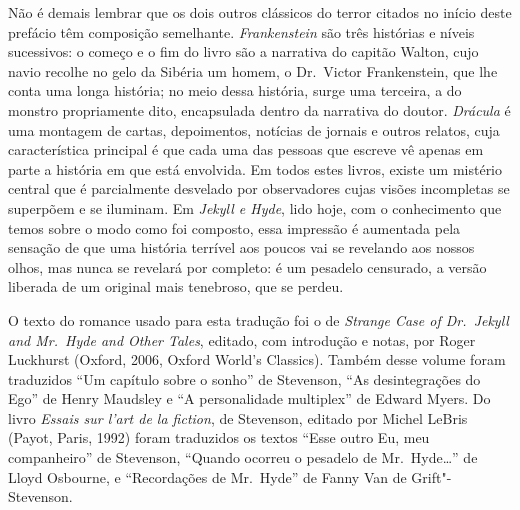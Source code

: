 Não é demais lembrar que os dois outros clássicos do terror citados no
início deste prefácio têm composição semelhante.  \textit{Frankenstein}
são três histórias e níveis sucessivos: o começo e o fim do livro são a
narrativa do capitão Walton, cujo navio recolhe no gelo da Sibéria um
homem, o Dr.~Victor Frankenstein, que lhe conta uma longa história; no
meio dessa história, surge uma terceira, a do monstro propriamente
dito, encapsulada dentro da narrativa do doutor.  \textit{Drácula} é
uma montagem de cartas, depoimentos, notícias de jornais e outros
relatos, cuja característica principal é que cada uma das pessoas que
escreve vê apenas em parte a história em que está envolvida.  Em todos
estes livros, existe um mistério central que é parcialmente desvelado
por observadores cujas visões incompletas se superpõem e se iluminam. 
Em \textit{Jekyll e Hyde}, lido hoje, com o
conhecimento que temos sobre o modo como foi composto, essa impressão é
aumentada pela sensação de que uma história terrível aos poucos vai se
revelando aos nossos olhos, mas nunca se revelará por completo: é um
pesadelo censurado, a versão liberada de um original mais tenebroso,
que se perdeu.\linebreak


\noindent O texto do romance usado para esta tradução foi o de \textit{Strange Case 
of Dr.~Jekyll and Mr.~Hyde and Other Tales}, editado, com introdução 
e notas, por Roger Luckhurst (Oxford, 2006, Oxford World’s Classics). 
Também desse volume foram traduzidos “Um capítulo sobre o sonho” de 
Stevenson, “As desintegrações do Ego” de Henry Maudsley e “A personalidade 
multiplex” de Edward Myers.  Do livro \textit{Essais sur l’art de la fiction}, de 
Stevenson, editado por Michel LeBris (Payot, Paris, 1992) foram 
traduzidos os textos “Esse outro Eu, meu companheiro” de Stevenson, “Quando 
ocorreu o pesadelo de Mr.~Hyde\ldots{}” de Lloyd Osbourne, 
e “Recordações de Mr.~Hyde” de Fanny Van de Grift"-Stevenson.

